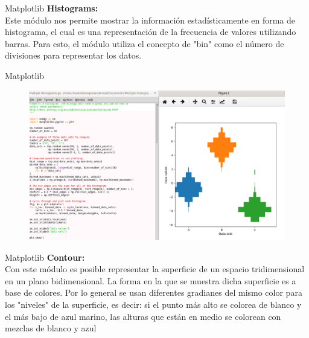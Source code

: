 \documentclass{beamer}
\begin{document}
\begin{frame}{Matplotlib}
	\textbf{Histograms:}\\ Este módulo nos permite mostrar la información estadísticamente en forma de histograma, el cual es una representación de la frecuencia de valores utilizando barras. Para esto, el módulo utiliza el concepto de "bin" como el número de divisiones para representar los datos.
	
\end{frame}

\begin{frame}{Matplotlib}
	\begin{figure}
		\centering
		\includegraphics[width=1.0\linewidth]{"../Python/Captura MHistograms"}
		\caption{}
		\label{fig:captura-mhistograms}
	\end{figure}
	
\end{frame}

\begin{frame}{Matplotlib}
	\textbf{Contour:}\\ Con este módulo es posible representar la superficie de un espacio tridimensional en un plano bidimensional. La forma en la que se muestra dicha superficie es a base de colores. Por lo general se usan diferentes gradianes del mismo color para los "niveles" de la superficie, es decir: si el punto más alto se colorea de blanco y el más bajo de azul marino, las alturas que están en medio se colorean con mezclas de blanco y azul
\end{frame}
\end{document}
